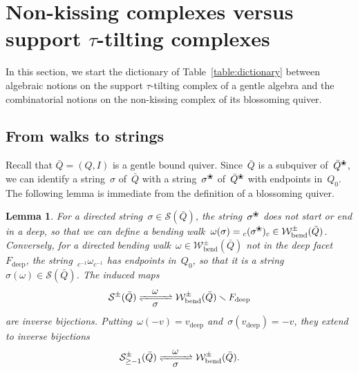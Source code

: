 \documentclass{amsart}
\newtheorem{lemma}[theorem]{Lemma}
\theoremstyle{definition}
\newcommand{\ssm}{\smallsetminus} %
\newcommand{\blossom}{^\text{\ding{96}}} %
\newcommand{\strings}{\mathcal{S}} %
\newcommand{\bendingWalks}{\mathcal{W}_\mathrm{bend}} %
\newcommand{\deep}{\mathrm{deep}} %
\begin{document}
\section{Non-kissing complexes versus support $\tau$-tilting complexes}
\label{sec:nkcvsttc}

In this section, we start the dictionary of Table~\ref{table:dictionary} between algebraic notions on the support $\tau$-tilting complex of a gentle algebra and the combinatorial notions on the non-kissing complex of its blossoming quiver.

\subsection{From walks to strings}
\label{subsec:walks2strings}

Recall that $\bar Q = (Q,I)$ is a gentle bound quiver.
Since~$\bar Q$ is a subquiver of~$\bar Q\blossom$, we can identify a string~$\sigma$ of~$\bar Q$ with a string~$\sigma\blossom$ of~$\bar Q\blossom$ with endpoints in~$Q_0$.
The following lemma is immediate from the definition of a blossoming quiver.

\begin{lemma}
\label{lem:bijections-STTC-NKC}
For a directed string~$\sigma \in \strings(\bar Q)$, the string~$\sigma\blossom$ does not start or end in a deep, so that we can define a bending walk~$\omega(\sigma) = \phantom{}_c (\sigma\blossom) \phantom{}_c \in \bendingWalks^\pm(\bar Q)$.
Conversely, for a directed bending walk~$\omega \in \bendingWalks^\pm(\bar Q)$ not in the deep facet~$F_\deep$, the string~$\phantom{}_{c^{-1}} \omega \phantom{}_{c^{-1}}$ has endpoints in~$Q_0$, so that it is a string~$\sigma(\omega) \in \strings(\bar Q)$.
The induced maps
\[
\strings^\pm(\bar Q) \xrightleftharpoons[\quad\mbox{$\sigma$}\;\quad]{\mbox{$\omega$}} \bendingWalks^\pm(\bar Q) \ssm F_\deep
\]
are inverse bijections.
Putting~$\omega(-v) = v_\deep$ and~$\sigma(v_\deep) = -v$, they extend to inverse bijections
\[
\strings_{\ge-1}^\pm(\bar Q) \xrightleftharpoons[\quad\mbox{$\sigma$}\;\quad]{\mbox{$\omega$}} \bendingWalks^\pm(\bar Q).
\]
\end{lemma}
\end{document}
